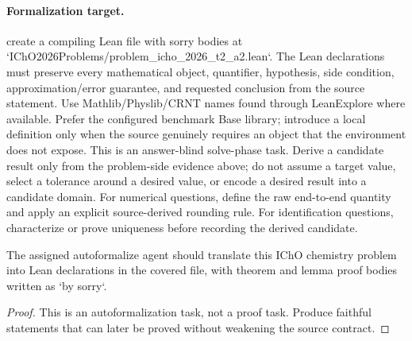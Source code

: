 \paragraph{Formalization target.}
create a compiling Lean file with sorry bodies at `IChO2026Problems/problem\_icho\_2026\_t2\_a2.lean`.
The Lean declarations must preserve every mathematical object, quantifier, hypothesis, side condition, approximation/error guarantee, and requested conclusion from the source statement.
Use Mathlib/Physlib/CRNT names found through LeanExplore where available. Prefer the configured benchmark Base library; introduce a local definition only when the source genuinely requires an object that the environment does not expose.
This is an answer-blind solve-phase task. Derive a candidate result only from the problem-side evidence above; do not assume a target value, select a tolerance around a desired value, or encode a desired result into a candidate domain.
For numerical questions, define the raw end-to-end quantity and apply an explicit source-derived rounding rule. For identification questions, characterize or prove uniqueness before recording the derived candidate.

\begin{theorem}
\label{thm:physics:icho_2026_t2_a2:target}
The assigned autoformalize agent should translate this IChO chemistry problem into Lean declarations in the covered file, with theorem and lemma proof bodies written as `by sorry`.
\end{theorem}
\begin{proof}
This is an autoformalization task, not a proof task. Produce faithful statements that can later be proved without weakening the source contract.
\end{proof}
